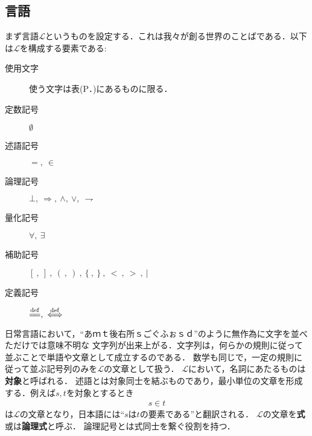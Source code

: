 	\begin{comment}
	\begin{quote}
		初めに言(ことば)があった。言は神と共にあった。言は神であった。\\
		この言は、初めに神と共にあった。\\
		万物は言によって成った。成ったもので、言によらずに成ったものは何一つなかった。
	\end{quote}
	ヨハネによる福音書の冒頭である．数学の世界もまたことばが支配する．
	ただし数学の世界におけることばには二つの階層がある．一つは記号や記号の並べ方を規定する下位のことばであり，
	もう一つは何が定理であるかを規定する上位のことばである．
	前者は我々が神の視点で創る世界のことばであり，後者は神である我々の世界のことばであるが，
	後者は論理と言い換える方が適当である．
	我々が創る世界は集合論と呼ばれ，数や関数など高校まで初等的に与えられてきたあらゆる概念がその世界の中で説明し直されることになる．
	我々が論理的思考を持っていたり自然にものを数えたり出来るのは，この世が神なる数学者によって創られたからであると信じて，
	本稿ではそういった生来の直感の一切合切を排して更地に立って数学を組み立てる．
	それは我々の我々による我々のための数学の世界である．つまり我々は本稿の神たる者となる．
	
	\end{comment}
	
\subsection{言語}
	
	まず言語$\mathcal{L}$というものを設定する．これは我々が創る世界のことばである．以下は$\mathcal{L}$を構成する要素である:
	\begin{description}
		\item[使用文字] 使う文字は表(P．\pageref{tab:alphabet})にあるものに限る．
		\item[定数記号] $\emptyset$
		\item[述語記号] $=,\ \in$
		\item[論理記号] $\bot,\ \Longrightarrow,\ \wedge,\ \vee,\ \rightharpoondown$
		\item[量化記号] $\forall,\ \exists$
		\item[補助記号] $[\ ,\ ]\ ,\ (\ ,\ )\ ,\ \{\ ,\ \}\ ,\ <\ ,\ >\ ,\ |$
		\item[定義記号] $\defeq,\ \defarrow$
	\end{description}
	
	日常言語において，``あｍｔ後右所ｓごぐふぉｓｄ''のように無作為に文字を並べただけでは意味不明な
	文字列が出来上がる．文字列は，何らかの規則に従って並ぶことで単語や文章として成立するのである．
	数学も同じで，一定の規則に従って並ぶ記号列のみを$\mathcal{L}$の文章として扱う．
	$\mathcal{L}$において，名詞にあたるものは{\bf 対象}と呼ばれる．
	述語とは対象同士を結ぶものであり，最小単位の文章を形成する．例えば$s,t$を対象とするとき
	\begin{align}
		s \in t
	\end{align}
	は$\mathcal{L}$の文章となり，日本語には``$s$は$t$の要素である''と翻訳される．
	$\mathcal{L}$の文章を{\bf 式}或は{\bf 論理式}と呼ぶ．
	論理記号とは式同士を繋ぐ役割を持つ．
	
